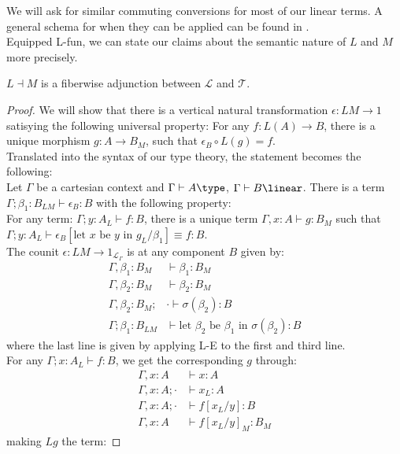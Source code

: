 We will ask for similar commuting conversions for most of our linear terms. A general schema for when they can be applied can be found in \cite{barber1996dual}.\\
Equipped L-fun, we can state our claims about the semantic nature of $L$ and $M$ more precisely.
\begin{thm}[$L \dashv M$]
$L \dashv M$ is a fiberwise adjunction between $\mathcal{L}$ and $\mathcal{T}$.
\begin{proof}
We will show that there is a vertical natural transformation $\epsilon : LM \to 1$ satisying the following universal property: 
For any $f : L(A) \to B$, there is a unique morphism $g : A \to B_M$, such that $\epsilon_B \circ L(g) = f$.\\
Translated into the syntax of our type theory, the statement becomes the following:\\
Let $\Gamma$ be a cartesian context and $\Gamma \vdash A \type$, $\Gamma \vdash B \linear$. There is a term $\Gamma; \beta_1 : B_{LM} \vdash \epsilon_B: B$ with the following property:\\
For any term: $\Gamma; y : A_L \vdash f : B$, there is a unique term $\Gamma, x : A \vdash g : B_{M}$ such that $\Gamma; y : A_L \vdash \epsilon_B[\text{let $x$ be $y$ in }g_L/\beta_1] \equiv f : B$.\\
 The counit $\epsilon : LM \to 1_{\mathcal{L}_{\Gamma}}$ is at any component $B$ given by:
 \[
  \begin{split}
    \Gamma, \beta_1 : B_{M} &\vdash \beta_1 : B_{M}\\
    \Gamma, \beta_2 : B_{M} &\vdash \beta_2 : B_{M}\\
    \Gamma, \beta_2 : B_{M}; &\cdot \vdash \sigma(\beta_2) : B\\
    \Gamma; \beta_1 : B_{LM} &\vdash \text{let $\beta_2$ be $\beta_1$ in }\sigma(\beta_2) : B 
  \end{split}
\]
  where the last line is given by applying L-E to the first and third line.\\
  For any $\Gamma; x : A_L \vdash f : B$, we get the corresponding $g$ through:
  \[
    \begin{split}
      \Gamma, x : A &\vdash x : A\\
      \Gamma, x : A; \cdot &\vdash x_L : A\\
      \Gamma, x : A; \cdot &\vdash f[x_L/y] : B\\
      \Gamma, x : A &\vdash f[x_L/y]_M : B_M
      \end{split}
    \]
    making $Lg$ the term:

\end{proof}
\end{thm}
